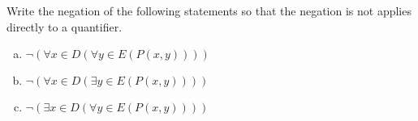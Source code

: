 \guard



\begin{exercise}
\label{exercise:negationOfMixedQuantifierStatements}
  Write the negation of the following statements so that the negation is not applies directly to a quantifier.
  \begin{enumerate}[(a)]
    \item $\neg(\forall x\in D(\forall y\in E (P(x,y)) ))$
    \item $\neg(\forall x\in D(\exists y\in E (P(x,y)) ))$
    \item $\neg(\exists x\in D(\forall y\in E (P(x,y)) ))$
  \end{enumerate}
\end{exercise}
